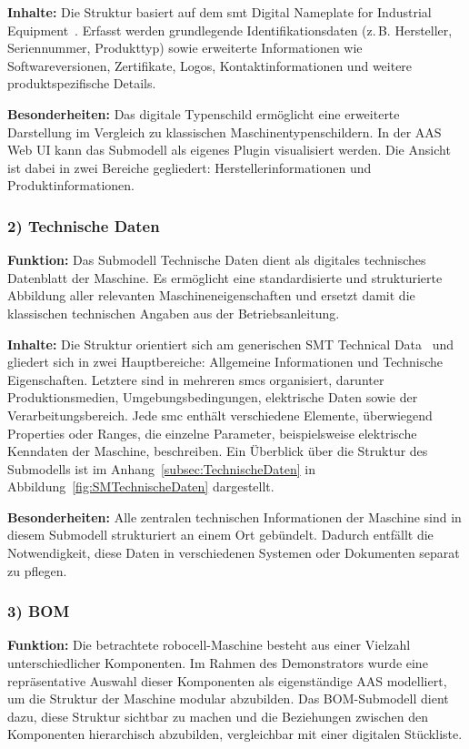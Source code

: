 \textbf{Inhalte:}  
Die Struktur basiert auf dem \acs{smt} Digital Nameplate for Industrial Equipment~\cite{SpezifikationTypenschild}.  
Erfasst werden grundlegende Identifikationsdaten (z.\,B. Hersteller, Seriennummer, Produkttyp) sowie erweiterte Informationen wie Softwareversionen, Zertifikate, Logos, Kontaktinformationen und weitere produktspezifische Details.

\textbf{Besonderheiten:}  
Das digitale Typenschild ermöglicht eine erweiterte Darstellung im Vergleich zu klassischen Maschinentypenschildern. In der AAS Web UI kann das Submodell als eigenes Plugin visualisiert werden. 
Die Ansicht ist dabei in zwei Bereiche gegliedert: Herstellerinformationen und Produktinformationen.

\subsubsection*{2) Technische Daten}
\vspace{-0.5em}
\textbf{Funktion:}  
Das Submodell Technische Daten dient als digitales technisches Datenblatt der Maschine.
Es ermöglicht eine standardisierte und strukturierte Abbildung aller relevanten Maschineneigenschaften und ersetzt damit die klassischen technischen Angaben aus der Betriebsanleitung.

\textbf{Inhalte:} 
Die Struktur orientiert sich am generischen SMT Technical Data~\cite{SpezifikaitonTechnischeDaten} und gliedert sich in zwei Hauptbereiche: Allgemeine Informationen und Technische Eigenschaften.
Letztere sind in mehreren \acsp{smc} organisiert, darunter Produktionsmedien, Umgebungsbedingungen, elektrische Daten sowie der Verarbeitungsbereich.
Jede \acs{smc} enthält verschiedene Elemente, überwiegend Properties oder Ranges, die einzelne Parameter, beispielsweise elektrische Kenndaten der Maschine, beschreiben.
Ein Überblick über die Struktur des Submodells ist im Anhang~\ref{subsec:TechnischeDaten} in Abbildung~\ref{fig:SMTechnischeDaten} dargestellt.

\textbf{Besonderheiten:}  
Alle zentralen technischen Informationen der Maschine sind in diesem Submodell strukturiert an einem Ort gebündelt.
Dadurch entfällt die Notwendigkeit, diese Daten in verschiedenen Systemen oder Dokumenten separat zu pflegen.

\subsubsection*{3) BOM}
\vspace{-0.5em}
\textbf{Funktion:}  
Die betrachtete robocell-Maschine besteht aus einer Vielzahl unterschiedlicher Komponenten.
Im Rahmen des Demonstrators wurde eine repräsentative Auswahl dieser Komponenten als eigenständige AAS modelliert, um die Struktur der Maschine modular abzubilden.
Das BOM-Submodell dient dazu, diese Struktur sichtbar zu machen und die Beziehungen zwischen den Komponenten hierarchisch abzubilden, vergleichbar mit einer digitalen Stückliste.

